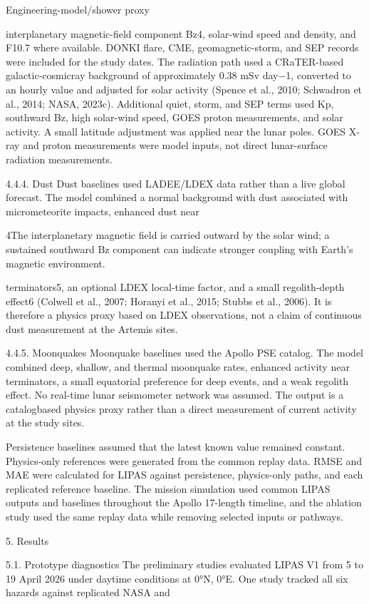 Engineering-model/shower proxy

interplanetary magnetic-field component Bz4, solar-wind speed and density, and F10.7 where available. DONKI flare, CME, geomagnetic-storm, and SEP records were included for the study dates. The radiation path used a CRaTER-based galactic-cosmicray background of approximately 0.38 mSv day−1, converted to an hourly value and adjusted for solar activity (Spence et al., 2010; Schwadron et al., 2014; NASA, 2023c). Additional quiet, storm, and SEP terms used Kp, southward Bz, high solar-wind speed, GOES proton measurements, and solar activity. A small latitude adjustment was applied near the lunar poles. GOES X-ray and proton measurements were model inputs, not direct lunar-surface radiation measurements.

4.4.4. Dust Dust baselines used LADEE/LDEX data rather than a live global forecast. The model combined a normal background with dust associated with micrometeorite impacts, enhanced dust near

4The interplanetary magnetic field is carried outward by the solar wind; a sustained southward Bz component can indicate stronger coupling with Earth's magnetic environment.

terminators5, an optional LDEX local-time factor, and a small regolith-depth effect6 (Colwell et al., 2007; Horanyi et al., 2015; Stubbs et al., 2006). It is therefore a physics proxy based on LDEX observations, not a claim of continuous dust measurement at the Artemis sites.

4.4.5. Moonquakes Moonquake baselines used the Apollo PSE catalog. The model combined deep, shallow, and thermal moonquake rates, enhanced activity near terminators, a small equatorial preference for deep events, and a weak regolith effect. No real-time lunar seismometer network was assumed. The output is a catalogbased physics proxy rather than a direct measurement of current activity at the study sites.

Persistence baselines assumed that the latest known value remained constant. Physics-only references were generated from the common replay data. RMSE and MAE were calculated for LIPAS against persistence, physics-only paths, and each replicated reference baseline. The mission simulation used common LIPAS outputs and baselines throughout the Apollo 17-length timeline, and the ablation study used the same replay data while removing selected inputs or pathways.

5. Results

5.1. Prototype diagnostics The preliminary studies evaluated LIPAS V1 from 5 to 19 April 2026 under daytime conditions at 0°N, 0°E. One study tracked all six hazards against replicated NASA and

